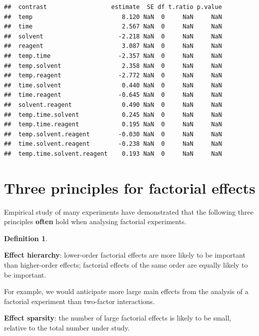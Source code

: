 \documentclass[
]{book}
\theoremstyle{definition}
\newtheorem{definition}{Definition}[chapter]
\theoremstyle{definition}
\theoremstyle{definition}
\theoremstyle{definition}
\theoremstyle{remark}
\begin{document}
\begin{verbatim}
##  contrast                  estimate  SE df t.ratio p.value
##  temp                         8.120 NaN  0     NaN     NaN
##  time                         2.567 NaN  0     NaN     NaN
##  solvent                     -2.218 NaN  0     NaN     NaN
##  reagent                      3.087 NaN  0     NaN     NaN
##  temp.time                   -2.357 NaN  0     NaN     NaN
##  temp.solvent                 2.358 NaN  0     NaN     NaN
##  temp.reagent                -2.772 NaN  0     NaN     NaN
##  time.solvent                 0.440 NaN  0     NaN     NaN
##  time.reagent                -0.645 NaN  0     NaN     NaN
##  solvent.reagent              0.490 NaN  0     NaN     NaN
##  temp.time.solvent            0.245 NaN  0     NaN     NaN
##  temp.time.reagent            0.195 NaN  0     NaN     NaN
##  temp.solvent.reagent        -0.030 NaN  0     NaN     NaN
##  time.solvent.reagent        -0.238 NaN  0     NaN     NaN
##  temp.time.solvent.reagent    0.193 NaN  0     NaN     NaN
\end{verbatim}

\hypertarget{three-principles-for-factorial-effects}{%
\section{Three principles for factorial effects}\label{three-principles-for-factorial-effects}}

Empirical study of many experiments \citep{BoxMeyer1986, Li2006} have demonstrated that the following three principles \textbf{often} hold when analysing factorial experiments.

\begin{definition}
\protect\hypertarget{def:effect-hierarchy}{}\label{def:effect-hierarchy}

\textbf{Effect hierarchy}: lower-order factorial effects are more likely to be important than higher-order effects; factorial effects of the same order are equally likely to be important.

For example, we would anticipate more large main effects from the analysis of a factorial experiment than two-factor interactions.

\end{definition}

\leavevmode\hypertarget{effect-sparsity}{}%
\textbf{Effect sparsity}: the number of large factorial effects is likely to be small, relative to the total number under study.
\end{document}
